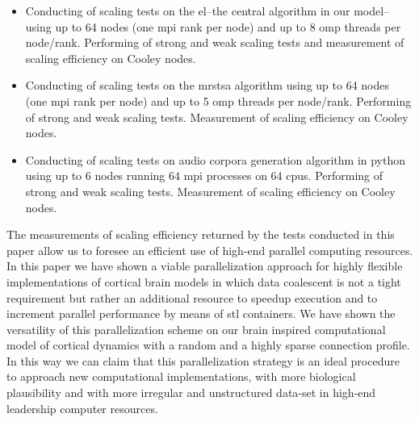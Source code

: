 \documentclass[11pt,a4paper]{article}
\begin{document}
\begin{itemize}
	\begin{itemize}
		\item Conducting of scaling tests on the \gls{el}--the central algorithm in our model--using up to 64 nodes (one \gls{mpi} rank per node) and up to 8 \gls{omp} threads per node/rank. Performing of strong and weak scaling tests and measurement of scaling efficiency on Cooley nodes.
		\item Conducting of scaling tests on the \gls{mrstsa} algorithm using up to 64 nodes (one \gls{mpi} rank per node) and up to 5 \gls{omp} threads per node/rank. Performing of strong and weak scaling tests. Measurement of scaling efficiency on Cooley nodes.
		\item Conducting of scaling tests on audio corpora generation algorithm in python using up to 6 nodes running 64 \gls{mpi} processes on 64 \glspl{cpu}. Performing of strong and weak scaling tests. Measurement of scaling efficiency on Cooley nodes.

	\end{itemize}

\end{itemize}

The measurements of scaling efficiency returned by the tests conducted in this paper allow us to foresee an efficient use of high-end parallel computing resources. In this paper we have shown a viable parallelization approach for highly flexible implementations of cortical brain models in which data coalescent is not a tight requirement but rather an additional resource to speedup execution and to increment parallel performance by means of \gls{stl} containers. We have shown the versatility of this parallelization scheme on our brain inspired computational model of cortical dynamics with a random and a highly sparse connection profile. In this way we can claim that this parallelization strategy is an ideal procedure to approach new computational implementations, with more biological plausibility and with more irregular and unstructured data-set in high-end leadership computer resources.
\end{document}
